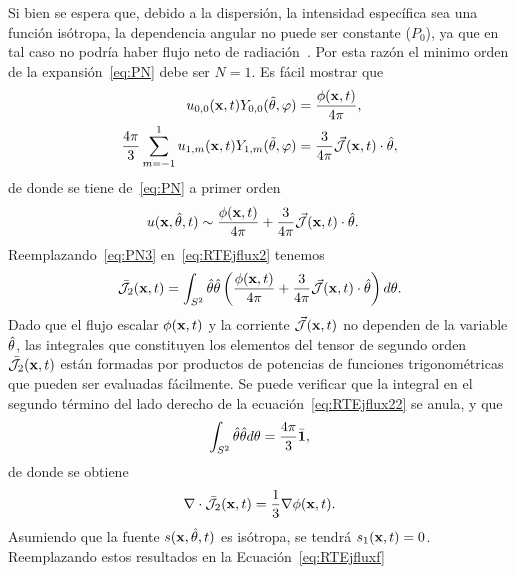  Si bien se espera que, debido a la dispersión, la intensidad específica sea una función isótropa, la dependencia angular no puede ser constante ($P_0$), ya que en tal caso 
no podría haber flujo neto de radiación~\cite[cap. 9, p. 176]{Ishimaru1978}. Por esta razón el minimo 
orden de la expansión~\eqref{eq:PN} debe ser $N=1$. 
Es fácil mostrar que
\begin{equation}
\begin{split}
\begin{aligned}
u_{0,0}(\mathbf{x},t) Y_{0,0}(\tilde{\theta},\varphi) &=\frac{\phi(\mathbf{x},t)}{4\pi},\\
\frac{4\pi}{3} \sum_{m=-1}^1 u_{1,m}(\mathbf{x},t)Y_{1,m} (\tilde{\theta},\varphi) & = \frac{3}{4\pi} \vec{ \mathcal{J}}(\mathbf{x},t) \cdot \hat{\theta},
\end{aligned}
\end{split}
\label{eq:PN2}
\end{equation}
de donde se tiene de~\eqref{eq:PN} a primer orden
\begin{equation}
\begin{split}
\begin{aligned}
u(\mathbf{x},\hat{\theta},t)&\sim \frac{\phi(\mathbf{x},t)}{4\pi}+\frac{3}{4\pi} \vec{ \mathcal{J}}(\mathbf{x},t) \cdot \hat{\theta}.
\end{aligned}
\end{split}
\label{eq:PN3}
\end{equation}
Reemplazando~\eqref{eq:PN3} en~\eqref{eq:RTEjflux2} tenemos
\begin{equation}
\bar{\mathcal{J}}_2(\mathbf{x},t)=\int_{S^2} \hat{\theta} \hat{\theta} \left(  \frac{\phi(\mathbf{x},t)}{4\pi}+\frac{3}{4\pi} \vec{ \mathcal{J}}(\mathbf{x},t) \cdot \hat{\theta} \right) d\theta.
\label{eq:RTEjflux22}
\end{equation}
Dado que el flujo escalar $\phi(\mathbf{x},t)$ y la corriente $\vec{ \mathcal{J}}(\mathbf{x},t)$ no dependen de la variable $\hat{\theta}$, las integrales que 
constituyen los elementos del tensor de segundo orden $\bar{\mathcal{J}}_2(\mathbf{x},t)$ están formadas 
por productos de potencias de funciones trigonométricas que pueden ser evaluadas fácilmente. 
Se puede verificar que la integral en el segundo término del lado derecho de la ecuación~\eqref{eq:RTEjflux22} se anula, y que~\cite[cap. 17, p. 544]{Modest2013}
\begin{equation}
\int_{S^2} \hat{\theta} \hat{\theta} d\theta=\frac{4\pi}{3} \bar{\mathbf{1}},
\label{eq:RTEjflux23}
\end{equation}
de donde se obtiene 
\begin{equation}
\nabla \cdot \bar{\mathcal{J}}_2(\mathbf{x},t)=\frac{1}{3}\nabla \phi(\mathbf{x},t).
\label{eq:RTEjflux24}
\end{equation}
Asumiendo que la fuente $s(\mathbf{x},\hat{\theta},t)$ es isótropa, se tendrá $s_1(\mathbf{x},t)= 0$. Reemplazando estos resultados en la Ecuación~\eqref{eq:RTEjfluxf}
